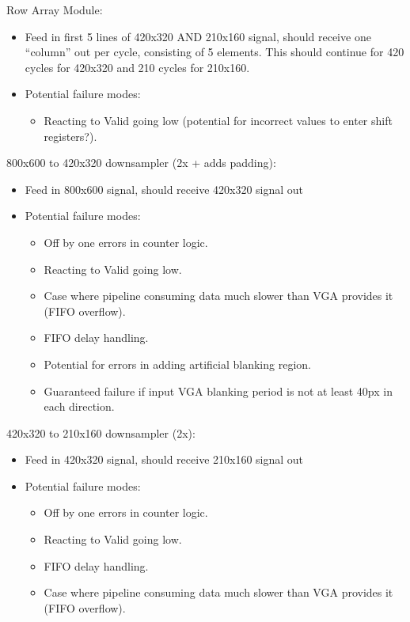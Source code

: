 \documentclass[11pt]{article}
\begin{document}
 Row Array Module:
\begin{itemize}
    \item Feed in first 5 lines of 420x320 AND 210x160 signal, should receive one ``column'' out per cycle, consisting of 5 elements. This should continue for 420 cycles for 420x320 and 210 cycles for 210x160.
    \item Potential failure modes:
        \begin{itemize}
            \item Reacting to Valid going low (potential for incorrect values to enter shift registers?).
        \end{itemize}
\end{itemize}


\noindent 800x600 to 420x320 downsampler (2x + adds padding):
\begin{itemize}
    \item Feed in 800x600 signal, should receive 420x320 signal out
    \item Potential failure modes:
        \begin{itemize}
            \item Off by one errors in counter logic.
            \item Reacting to Valid going low.
            \item Case where pipeline consuming data much slower than VGA provides it (FIFO overflow).
            \item FIFO delay handling.
            \item Potential for errors in adding artificial blanking region.
            \item Guaranteed failure if input VGA blanking period is not at least 40px in each direction.
        \end{itemize}
\end{itemize}


\noindent 420x320 to 210x160 downsampler (2x):
\begin{itemize}
    \item Feed in 420x320 signal, should receive 210x160 signal out
    \item Potential failure modes:
        \begin{itemize}
            \item Off by one errors in counter logic.
            \item Reacting to Valid going low.
            \item FIFO delay handling.
            \item Case where pipeline consuming data much slower than VGA provides it (FIFO overflow).
        \end{itemize}
\end{itemize}
\end{document}
